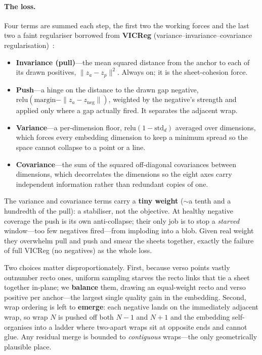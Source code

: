 \documentclass[10pt,twocolumn,a4paper]{article}
\begin{document}
\paragraph{The loss.} Four terms are summed each step, the first two the working
forces and the last two a faint regulariser borrowed from \textbf{VICReg}
(variance--invariance--covariance regularisation)~\cite{vicreg}:
\begin{itemize}[nosep]
  \item \textbf{Invariance (pull)}---the mean squared distance from the anchor
  to each of its drawn positives, $\|z_a-z_p\|^2$. Always on; it is the
  sheet-cohesion force.
  \item \textbf{Push}---a hinge on the distance to the drawn gap negative,
  $\mathrm{relu}(\mathrm{margin}-\|z_a-z_{\mathrm{neg}}\|)$, weighted by the
  negative's strength and applied only where a gap actually fired. It separates
  the adjacent wrap.
  \item \textbf{Variance}---a per-dimension floor,
  $\mathrm{relu}(1-\mathrm{std}_d)$ averaged over dimensions, which forces every
  embedding dimension to keep a minimum spread so the space cannot collapse to a
  point or a line.
  \item \textbf{Covariance}---the sum of the squared off-diagonal covariances
  between dimensions, which decorrelates the dimensions so the eight axes carry
  independent information rather than redundant copies of one.
\end{itemize}
The variance and covariance terms carry a \textbf{tiny weight} ($\sim$a tenth and
a hundredth of the pull): a stabiliser, not the objective. At healthy negative
coverage the push is its own anti-collapse; their only job is to stop a
\emph{starved} window---too few negatives fired---from imploding into a blob.
Given real weight they overwhelm pull and push and smear the sheets together,
exactly the failure of full VICReg (no negatives) as the whole loss.

Two choices matter disproportionately. First, because verso points vastly
outnumber recto ones, uniform sampling starves the recto links that tie a sheet
together in-plane; we \textbf{balance} them, drawing an equal-weight recto and
verso positive per anchor---the largest single quality gain in the embedding.
Second, wrap ordering is left to \textbf{emerge}: each negative lands on the
immediately adjacent wrap, so wrap $N$ is pushed off both $N{-}1$ and $N{+}1$ and
the embedding self-organises into a ladder where two-apart wraps sit at opposite
ends and cannot glue. Any residual merge is bounded to \emph{contiguous}
wraps---the only geometrically plausible place.
\end{document}
